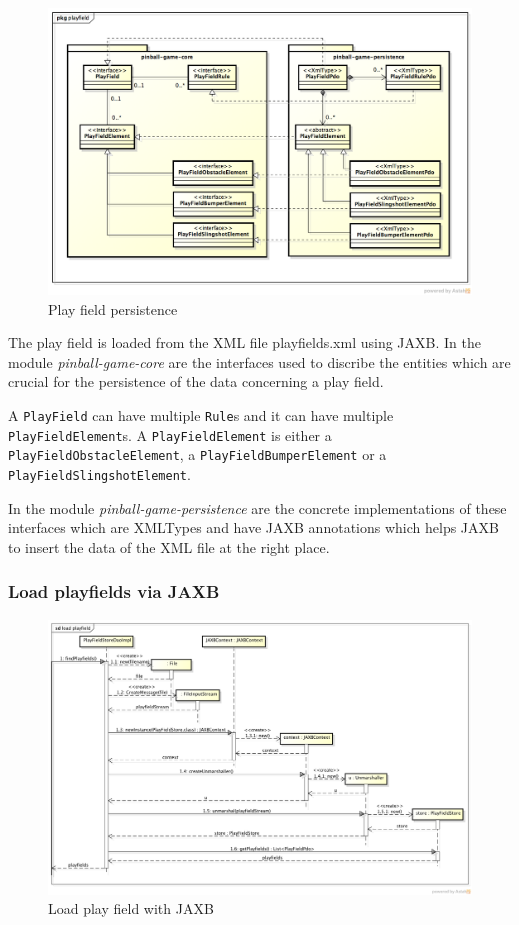 \documentclass[fontsize=12pt,
               paper=a4,
               twoside=false,
               parskip=half,
               ]{scrartcl}
\begin{document}
\begin{figure}[h!]
	\centering
	\includegraphics[width=15.5cm]{./img/persistence-playfield.png}
	\caption[Play field persistence]{Play field persistence}
	\label{fig:playfield_persistence}
\end{figure}

The play field is loaded from the XML file playfields.xml using JAXB. In the module \emph{pinball-game-core} are the interfaces used to discribe the entities which are crucial for the persistence of the data concerning a play field.

A \texttt{PlayField} can have multiple \texttt{Rule}s and it can have multiple \texttt{PlayFieldElement}s. A \texttt{PlayFieldElement} is either a \texttt{PlayFieldObstacleElement}, a \texttt{PlayFieldBumperElement} or a \texttt{PlayFieldSlingshotElement}.

In the module \emph{pinball-game-persistence} are the concrete implementations of these interfaces which are XMLTypes and have JAXB annotations which helps JAXB to insert the data of the XML file at the right place.

\subsubsection{Load playfields via JAXB}

\begin{figure}[h!]
	\centering
	\includegraphics[width=15.5cm]{./img/jaxb-load-playfield-sd.png}
	\caption[Load play field]{Load play field with JAXB}
	\label{fig:load_playfield}
\end{figure}
\end{document}
